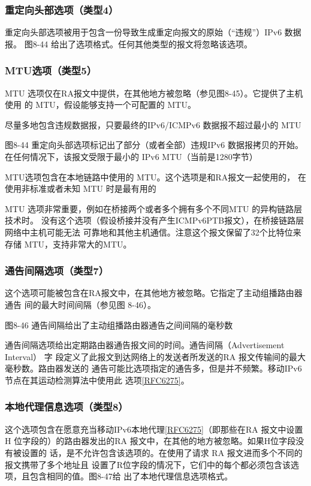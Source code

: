 \subsubsection{重定向头部选项（类型4）}
重定向头部选项被用于包含一份导致生成重定向报文的原始（“违规”）IPv6 数据报。
图8-44 给出了选项格式。任何其他类型的报文将忽略该选项。

\subsubsection{MTU选项（类型5）}

MTU 选项仅在RA报文中提供，在其他地方被忽略（参见图8-45）。它提供了主机使用
的 MTU，假设能够支持一个可配置的 MTU。

尽量多地包含违规数据报，只要最终的IPv6/ICMPv6 数据报不超过最小的 MTU

图8-44 重定向头部选项标记出了部分（或者全部）违规IPv6 数据报拷贝的开始。
在任何情况下，该报文受限于最小的 IPv6 MTU（当前是1280字节）

MTU选项包含在本地链路中使用的 MTU。这个选项是和RA报文一起使用的，
在使用非标准或者未知 MTU 时是最有用的

MTU 选项非常重要，例如在桥接两个或者多个拥有多个不同MTU 的异构链路层技术时。
没有这个选项（假设桥接并没有产生ICMPv6PTB报文），在桥接链路层网络中主机可能无法
可靠地和其他主机通信。注意这个报文保留了32个比特位来存储 MTU，支持非常大的MTU。

\subsubsection{通告间隔选项（类型7）}

这个选项可能被包含在RA报文中，在其他地方被忽略。它指定了主动组播路由器通告
间的最大时间间隔（参见图 8-46）。

图8-46 通告间隔给出了主动组播路由器通告之间间隔的毫秒数

通告间隔选项给出定期路由器通告报文间的时间。通告间隔（Advertisement Interval） 字
段定义了此报文到达网络上的发送者所发送的RA 报文传输间的最大毫秒数。路由器发送的
通告可能比选项指定的通告多，但是并不频繁。移动IPv6节点在其运动检测算法中使用此
选项\href{https://www.rfc-editor.org/rfc/rfc6275}{[RFC6275]}。

\subsubsection{本地代理信息选项（类型8）}
这个选项包含在愿意充当移动IPv6本地代理\href{https://www.rfc-editor.org/rfc/rfc6275}{[RFC6275]}（即那些在RA
报文中设置H
位字段的）的路由器发出的RA 报文中，在其他的地方被忽略。如果H位字段没有被设置的
话，是不允许包含该选项的。在使用了请求 RA 报文进而多个不同的报文携带了多个地址且
设置了R位字段的情况下，它们中的每个都必须包含该选项，且包含相同的值。图8-47给
出了本地代理信息选项格式。

